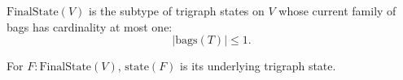\(\mathrm{FinalState}(V)\) is the subtype of trigraph states on \(V\)
whose current family of bags has cardinality at most one:
\[
  |\mathrm{bags}(T)|\le 1.
\]

For \(F:\mathrm{FinalState}(V)\), \(\mathrm{state}(F)\) is its
underlying trigraph state.
